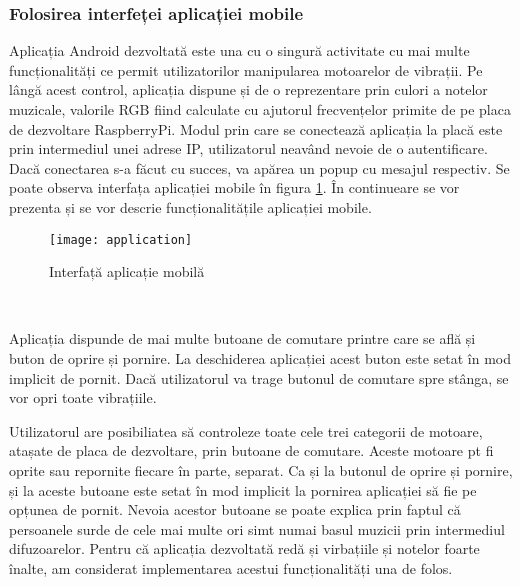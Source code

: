 \documentclass[../IoMusT.tex]{subfiles}
\begin{document}
\subsubsection{Folosirea interfeței aplicației mobile}
Aplicația Android dezvoltată este una cu o singură activitate cu mai multe funcționalități ce permit utilizatorilor manipularea motoarelor de vibrații.
 Pe lângă acest control, aplicația dispune și de o reprezentare prin culori a notelor muzicale, valorile RGB fiind calculate cu ajutorul frecvențelor primite de pe placa de dezvoltare RaspberryPi. Modul prin care se conectează aplicația la placă este prin intermediul unei adrese IP, utilizatorul neavând nevoie de o autentificare. Dacă conectarea s-a făcut cu succes, va apărea un popup cu mesajul respectiv. Se poate observa interfața aplicației mobile în figura \ref{fig:application}. În continueare se vor prezenta și se vor descrie funcționalitățile aplicației mobile.
\begin{figure}[h]
\begin{center}
\texttt{[image: application]}
\caption{Interfață aplicație mobilă}
\label{fig:application}
\end{center}
\end{figure}
\\
\par Aplicația dispunde de mai multe butoane de comutare printre care se află și buton de oprire și pornire. La deschiderea aplicației acest buton este setat în mod implicit de pornit. Dacă utilizatorul va trage butonul de comutare spre stânga, se vor opri toate vibrațiile.
\\ %
\par Utilizatorul are posibiliatea să controleze toate cele trei categorii de motoare, atașate de placa de dezvoltare, prin butoane de comutare. Aceste motoare pt fi oprite sau repornite fiecare în parte, separat. Ca și la butonul de oprire și pornire, și la aceste butoane este setat în mod implicit la pornirea aplicației să fie pe opțunea de pornit. Nevoia acestor butoane se poate explica prin faptul că persoanele surde de cele mai multe ori simt numai basul muzicii prin intermediul difuzoarelor. Pentru că aplicația dezvoltată redă și virbațiile și notelor foarte înalte, am considerat implementarea acestui funcționalități una de folos. 
\end{document}
